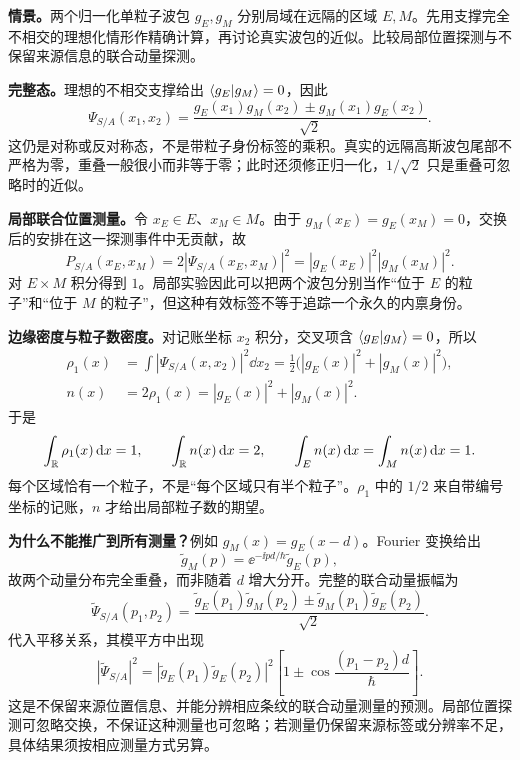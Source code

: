 \textbf{情景。}两个归一化单粒子波包 $g_E,g_M$ 分别局域在远隔的区域 $E,M$。先用支撑完全不相交的理想化情形作精确计算，再讨论真实波包的近似。比较局部位置探测与不保留来源信息的联合动量探测。

\begin{checkedsolution}
\textbf{完整态。}理想的不相交支撑给出 $\left\langle g_E \middle| g_M \right\rangle=0$，因此
\begin{equation}
  \Psi_{S/A}(x_1,x_2)
   =\frac{g_E(x_1)g_M(x_2)\pm g_M(x_1)g_E(x_2)}{\sqrt2}.
\end{equation}
这仍是对称或反对称态，不是带粒子身份标签的乘积。真实的远隔高斯波包尾部不严格为零，重叠一般很小而非等于零；此时还须修正归一化，$1/\sqrt2$ 只是重叠可忽略时的近似。

\textbf{局部联合位置测量。}令 $x_E\in E$、$x_M\in M$。由于 $g_M(x_E)=g_E(x_M)=0$，交换后的安排在这一探测事件中无贡献，故
\begin{equation}
  \boxed{P_{S/A}(x_E,x_M)=2|\Psi_{S/A}(x_E,x_M)|^2
    =|g_E(x_E)|^2|g_M(x_M)|^2}.
\end{equation}
对 $E\times M$ 积分得到 $1$。局部实验因此可以把两个波包分别当作“位于 $E$ 的粒子”和“位于 $M$ 的粒子”，但这种有效标签不等于追踪一个永久的内禀身份。

\textbf{边缘密度与粒子数密度。}对记账坐标 $x_2$ 积分，交叉项含 $\left\langle g_E \middle| g_M \right\rangle=0$，所以
\begin{align}
  \rho_1(x)&=\int|\Psi_{S/A}(x,x_2)|^2\dd x_2
    =\frac12\bigl(|g_E(x)|^2+|g_M(x)|^2\bigr),\\
  n(x)&=2\rho_1(x)=|g_E(x)|^2+|g_M(x)|^2.
\end{align}
于是
\begin{equation}
  \int_{\mathbb{R}}\rho_1(x)\mathop{}\!\mathrm{d} x=1,\qquad
  \int_{\mathbb{R}}n(x)\mathop{}\!\mathrm{d} x=2,\qquad
  \int_E n(x)\mathop{}\!\mathrm{d} x=\int_M n(x)\mathop{}\!\mathrm{d} x=1.
\end{equation}
每个区域恰有一个粒子，不是“每个区域只有半个粒子”。$\rho_1$ 中的 $1/2$ 来自带编号坐标的记账，$n$ 才给出局部粒子数的期望。

\textbf{为什么不能推广到所有测量？}例如 $g_M(x)=g_E(x-d)$。Fourier 变换给出
\begin{equation}
  \widetilde g_M(p)=\ee^{-\ii pd/\hbar}\widetilde g_E(p),
\end{equation}
故两个动量分布完全重叠，而非随着 $d$ 增大分开。完整的联合动量振幅为
\begin{equation}
  \widetilde\Psi_{S/A}(p_1,p_2)
    =\frac{\widetilde g_E(p_1)\widetilde g_M(p_2)
       \pm\widetilde g_M(p_1)\widetilde g_E(p_2)}{\sqrt2}.
\end{equation}
代入平移关系，其模平方中出现
\begin{equation}
  |\widetilde\Psi_{S/A}|^2
   =|\widetilde g_E(p_1)\widetilde g_E(p_2)|^2
     \left[1\pm\cos\frac{(p_1-p_2)d}{\hbar}\right].
\end{equation}
这是不保留来源位置信息、并能分辨相应条纹的联合动量测量的预测。局部位置探测可忽略交换，不保证这种测量也可忽略；若测量仍保留来源标签或分辨率不足，具体结果须按相应测量方式另算。
\end{checkedsolution}


